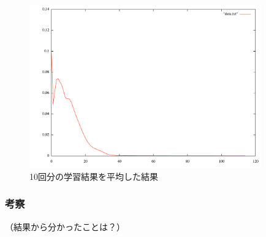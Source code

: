 \begin{figure}[h]
 \begin{center}
  \includegraphics[width=10.0cm]{figs/ex_ave.pdf}
  \caption{10回分の学習結果を平均した結果}
  \label{graph:level1.1-2}
 \end{center}
\end{figure}

\subsubsection{考察}
（結果から分かったことは？）

